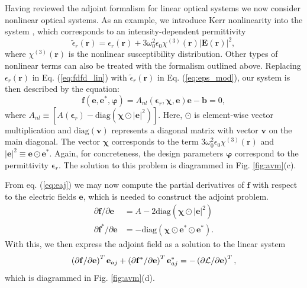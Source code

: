 Having reviewed the adjoint formalism for linear optical systems we now consider nonlinear optical systems. As an example, we introduce Kerr nonlinearity into the system \cite{Boyd__2008}, which corresponds to an intensity-dependent permittivity
%
\begin{equation}
\tilde{\epsilon}_r(\mathbf{r}) = \epsilon_r(\mathbf{r}) + 3\omega_0^2 \epsilon_0\chi^{(3)}(\mathbf{r}) \left|\mathbf{E}(\mathbf{r}) \right|^2,
\label{eq:eps_mod}
\end{equation}
%
where $\chi^{(3)}(\mathbf{r})$ is the nonlinear susceptibility distribution. Other types of nonlinear terms can also be treated with the formalism outlined above. Replacing $\epsilon_r(\mathbf{r})$ in Eq. (\ref{eq:fdfd_lin}) with $\tilde{\epsilon}_r(\mathbf{r})$ in Eq. (\ref{eq:eps_mod}), our system is then described by the equation:
%
\begin{equation}
\mathbf{f}(\mathbf{e}, \mathbf{e}^*, \bm{\varphi}) = A_{nl}(\bm{\epsilon}_r, \bm{\chi}, \mathbf{e}) \mathbf{e} - \mathbf{b} = 0,
\label{eq:nl_forward}
\end{equation}
%
where $A_{nl} \equiv \left[ A(\bm{\epsilon}_r) - \textrm{diag}\left( \bm{\chi} \odot |
\mathbf{e}|^2 \right) \right]$.  Here, $\odot$ is element-wise vector multiplication and $\textrm{diag}(\mathbf{v})$ represents a diagonal matrix with vector $\mathbf{v}$ on the main diagonal.  The vector $\bm{\chi}$ corresponds to the term $3\omega_0^2\epsilon_0 \chi^{(3)}(\mathbf{r})$ and
$|\mathbf{e}|^2 \equiv \mathbf{e} \odot \mathbf{e}^*$.  Again, for concreteness, the design parameters $\bm{\varphi}$ correspond to the permittivity $\bm{\epsilon}_r$. The solution to this problem is diagrammed in Fig. \ref{fig:avm}(c).

From eq. (\ref{eq:eaj}) we may now compute the partial derivatives of $\mathbf{f}$ with respect to the electric fields $\mathbf{e}$, which is needed to construct the adjoint problem.
%
\begin{align}
\partial \mathbf{f} / \partial \mathbf{e} &= A - 2 \textrm{diag}\left( \bm{\chi} \odot |\mathbf{e}|^2  \right)\\
\partial \mathbf{f}^* / \partial \mathbf{e} &= -\textrm{diag}\left( \bm{\chi} \odot \mathbf{e}^* \odot \mathbf{e}^* \right).
\end{align}
%
With this, we then express the adjoint field as a solution to the linear system
%
\begin{equation}
\left( \partial \mathbf{f} / \partial \mathbf{e} \right)^T \mathbf{e}_{aj} + \left( \partial \mathbf{f}^* / \partial \mathbf{e} \right)^T \mathbf{e}_{aj}^* = -\left( \partial \mathcal{L}/\partial \mathbf{e}\right)^T,
\label{eq:adjoint_nonlin}
\end{equation}
%
which is diagrammed in Fig. \ref{fig:avm}(d).

